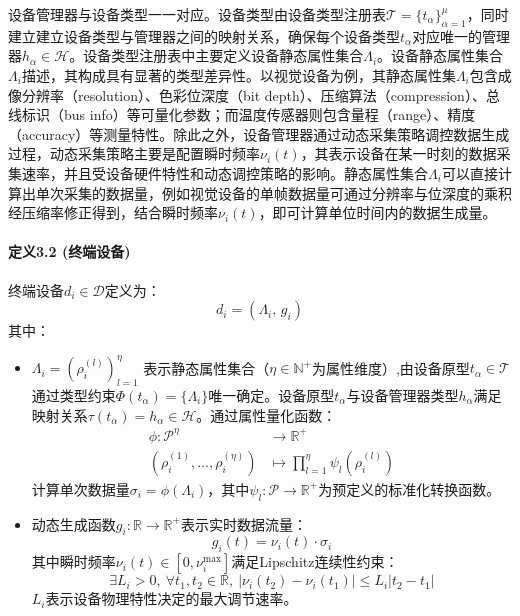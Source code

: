设备管理器与设备类型一一对应。设备类型由设备类型注册表$\mathcal{T} = \{t_\alpha\}_{\alpha=1}^\mu$，同时建立建立设备类型与管理器之间的映射关系，确保每个设备类型$t_\alpha$对应唯一的管理器$h_\alpha \in \mathcal{H}$。设备类型注册表中主要定义设备静态属性集合$\Lambda_i$。设备静态属性集合$\Lambda_i$描述，其构成具有显著的类型差异性。以视觉设备为例，其静态属性集$\Lambda_i$包含成像分辨率（resolution）、色彩位深度（bit depth）、压缩算法（compression）、总线标识（bus info）等可量化参数；而温度传感器则包含量程（range）、精度（accuracy）等测量特性。除此之外，设备管理器通过动态采集策略调控数据生成过程，动态采集策略主要是配置瞬时频率$\nu_i(t)$，其表示设备在某一时刻的数据采集速率，并且受设备硬件特性和动态调控策略的影响。静态属性集合$\Lambda_i$可以直接计算出单次采集的数据量，例如视觉设备的单帧数据量可通过分辨率与位深度的乘积经压缩率修正得到，结合瞬时频率$\nu_i(t)$，即可计算单位时间内的数据生成量。



\paragraph{定义3.2 (终端设备)} 终端设备$d_i \in \mathcal{D}$定义为：
\[
d_i = (\Lambda_i,\, g_i)
\]
其中：
\begin{itemize}
    \item $\Lambda_i = (\rho^{(l)}_i)_{l=1}^{\eta}$ 表示静态属性集合（$\eta \in \mathbb{N}^+$为属性维度）,由设备原型$t_\alpha \in \mathcal{T}$ 通过类型约束$\Phi(t_\alpha) = \{\Lambda_i\}$唯一确定。设备原型$t_\alpha$与设备管理器类型$h_\alpha$满足映射关系$\tau(t_\alpha) = h_\alpha \in \mathcal{H}$。通过属性量化函数：
        \begin{align*}
            \phi: \mathcal{P}^\eta & \to \mathbb{R}^+ \\
            (\rho^{(1)}_i, \ldots, \rho^{(\eta)}_i) & \mapsto \prod_{l=1}^{\eta} \psi_l(\rho^{(l)}_i)
        \end{align*}
    计算单次数据量$\sigma_i = \phi(\Lambda_i)$，其中$\psi_l: \mathcal{P} \to \mathbb{R}^+$为预定义的标准化转换函数。
    \item 动态生成函数$g_i: \mathbb{R} \to \mathbb{R}^+$表示实时数据流量：
        \[
        g_i(t) = \nu_i(t) \cdot \sigma_i
        \]
    其中瞬时频率$\nu_i(t) \in [0, \nu_i^{\max}]$满足Lipschitz连续性约束：
        \[
        \exists L_i > 0,\ \forall t_1, t_2 \in \mathbb{R},\ |\nu_i(t_2) - \nu_i(t_1)| \leq L_i |t_2 - t_1|
        \]
    $L_i$表示设备物理特性决定的最大调节速率。
\end{itemize}


